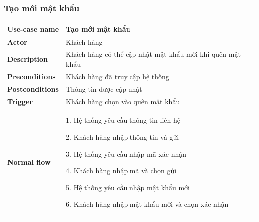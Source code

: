         \subsubsection{Tạo mới mật khẩu}
            \begin{longtable}{| p{} | p{} |} 
                \hline
                    \textbf{Use-case name} 
                & 
                    Tạo mới mật khẩu
                \\
                \hline
                    \textbf{Actor} 
                & 
                    Khách hàng
                \\
                \hline
                    \textbf{Description} 
                & 
                  Khách hàng có thể cập nhật mật khẩu mới khi quên mật khẩu
                \\
                \hline
                    \textbf{Preconditions} 
                &
                    Khách hàng đã truy cập hệ thống
                \\
                \hline
                    \textbf{Postconditions} 
                & 
                    Thông tin được cập nhật
                \\
                \hline
                    \textbf{Trigger} 
                & 
                    Khách hàng chọn vào quên mật khẩu
                \\
                \hline
                \begin{flushleft}
                    \textbf{Normal flow}
                \end{flushleft}
                & 
                1. Hệ thống yêu cầu thông tin liên hệ
                    
                    2. Khách hàng nhập thông tin và gửi
                    
                    3. Hệ thống yêu cầu nhập mã xác nhận
                    
                    4. Khách hàng nhập mã và chọn gửi
                    
                    5. Hệ thống yêu cầu nhập mật khẩu mới
                    
                    6. Khách hàng nhập mật khẩu mới và chọn xác nhận
                    

\end{longtable}
